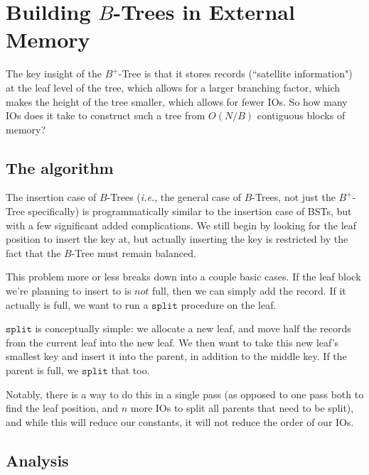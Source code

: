 \documentclass[fleqn]{article}
\begin{document}


\section{Building $B$-Trees in External Memory	}

The key insight of the $B^{+}$-Tree is that it stores records (``satellite information") at the leaf level of the tree, which allows for a larger branching factor, which makes the height of the tree smaller, which allows for fewer IOs. So how many IOs does it take to construct such a tree from $O(N/B)$ contiguous blocks of memory?

\subsection{The algorithm}

The insertion case of $B$-Trees (\textit{i.e.}, the general case of $B$-Trees, not just the $B^+$-Tree specifically) is programmatically similar to the insertion case of BSTs, but with a few significant added complications. We still begin by looking for the leaf position to insert the key at, but actually inserting the key is restricted by the fact that the $B$-Tree must remain balanced.

This problem more or less breaks down into a couple basic cases. If the leaf block we're planning to insert to is $\textit{not}$ full, then we can simply add the record. If it actually is full, we want to run a $\texttt{split}$ procedure on the leaf.

$\texttt{split}$ is conceptually simple: we allocate a new leaf, and move half the records from the current leaf into the new leaf. We then want to take this new leaf's smallest key and insert it into the parent, in addition to the middle key. If the parent is full, we $\texttt{split}$ that too.

Notably, there is a way to do this in a single pass (as opposed to one pass both to find the leaf position, and $n$ more IOs to split all parents that need to be split), and while this will reduce our constants, it will not reduce the order of our IOs.

\subsection{Analysis}
\end{document}
